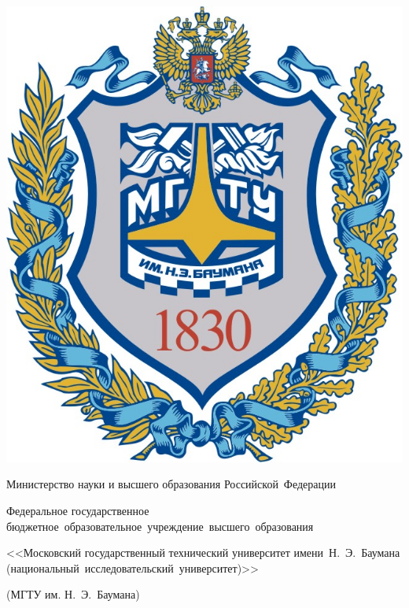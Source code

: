 \begin{titlepage}
    \fontsize{12pt}{12pt}\selectfont

    \noindent
    \begin{center}
        \begin{minipage}{0.14\textwidth}
            \includegraphics[width=\linewidth]{img/bmstu_logo.jpg}
        \end{minipage}
        \begin{minipage}{0.85\textwidth}\centering\bfseries
            {
                \linespread{1}\selectfont
                \vspace{0.1cm}
                {Министерство науки и высшего образования Российской~Федерации}

                {Федеральное государственное бюджетное~образовательное~учреждение~высшего~образования}

                {<<Московский государственный технический университет имени~Н.~Э.~Баумана (национальный~исследовательский~университет)>>}

                {(МГТУ им. Н.~Э.~Баумана)}
                \vspace{0.1cm}
            }
        \end{minipage}


\end{center}
\end{titlepage}
